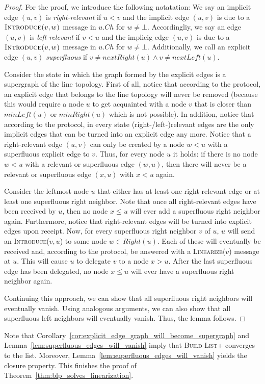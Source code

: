 \documentclass[a4paper,USenglish]{lipics}
\newcommand{\blp}{\textsc{Build-List+}\xspace}
\newcommand{\linearize}[1]{\textsc{Linearize(\ensuremath{#1})}\xspace}
\newcommand{\introduce}[1]{\textsc{Introduce(\ensuremath{#1})}\xspace}
\begin{document}
\begin{proof}
    For the proof, we introduce the following notatation: We say an implicit edge $(u,v)$ is \emph{right-relevant} if $u < v$ and the implicit edge $(u,v)$ is due to a $\introduce{v,w}$ message in $u.Ch$ for $w \neq \bot$.
    Accordingliy, we say an edge $(u,v)$ is \emph{left-relevant} if $v < u$ and the implicig edge $(u,v)$ is due to a $\introduce{v,w}$ message in $u.Ch$ for $w \neq \bot$.
    Additionally, we call an explicit edge $(u,v)$ \emph{superfluous} if $v \neq nextRight(u) \land v \neq nextLeft(u)$.


  Consider the state in which the graph formed by the explicit edges is a supergraph of the line topology.
  First of all, notice that according to the protocol, an explicit edge  that belongs to the line topology will never be removed (because this would require a node $u$ to get acquainted with a node $v$ that is closer than $minLeft(u)$ or $minRight(u)$ which is not possible).
  In addition, notice that according to the protocol, in every state (right-/left-)relevant edges are the only implicit edges that can be turned into an explicit edge any more.
  Notice that a right-relevant edge $(u,v)$ can only be created by a node $w < u$ with a superfluous explicit edge to $v$.
  Thus, for every node $u$ it holds: if there is no node $w < u$ with a relevant or superfluous edge $(w,u)$, then there will never be a relevant or superfluous edge $(x,u)$ with $x < u$ again.
  
  Consider the leftmost node $u$ that either has at least one right-relevant edge or at least one superfluous right neighbor.
  Note that once all right-relevant edges have been received by $u$, then no node $x \leq u$ will ever add a superfluous right neighbor again.
  Furthermore, notice that right-relevant edges will be turned into explicit edges upon receipt.
  Now, for every superfluous right neighbor $v$ of $u$, $u$ will send an \introduce{v,u} to some node $w \in Right(u)$.
  Each of these will eventually be received and, according to the protocol, be answered with a \linearize{v} message at $u$.
  This will cause $u$ to delegate $v$ to a node $x > u$.
  After the last superfluous edge has been delegated, no node $x \leq u$ will ever have a superfluous right neighbor again.
  
  Continuing this approach, we can show that all superfluous right neighbors will eventually vanish.
  Using analogous arguments, we can also show that all superfluous left neighbors will eventually vanish.
  Thus, the lemma follows.
\end{proof}
Note that Corollary~\ref{cor:explicit_edge_graph_will_become_supergraph} and Lemma~\ref{lem:superfluous_edges_will_vanish} imply that \blp converges to the list.
Moreover, Lemma~\ref{lem:superfluous_edges_will_vanish} yields the closure property.
This finishes the proof of Theorem~\ref{thm:blp_solves_linearization}.
\end{document}
